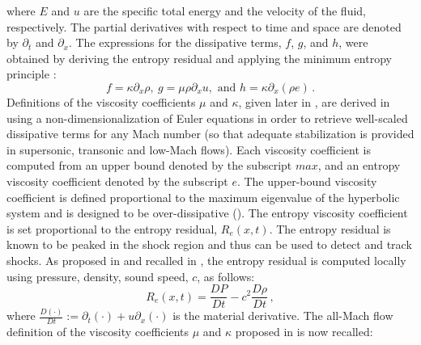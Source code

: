 \documentclass{inputs/mc2015}
\begin{document}
%
where $E$ and $u$ are the specific total energy and the velocity of the fluid, respectively. The partial derivatives with respect to time and space are denoted by $\partial_t$ and $\partial_x$. The expressions for the dissipative terms, $f$, $g$, and $h$, were obtained by deriving the entropy residual and applying the minimum entropy principle \cite{jlg}:
%
\begin{equation}
f = \kappa \partial_x \rho , \ g = \mu \rho \partial_x u, \text{  and  } h = \kappa \partial_x \left( \rho e \right) \, . 
\end{equation}
%
Definitions of the viscosity coefficients $\mu$ and $\kappa$, given later in , are derived in \cite{Marco_paper_low_mach} using a non-dimensionalization of Euler equations in order to retrieve well-scaled dissipative terms for any Mach number (so that adequate stabilization is provided in supersonic, transonic and low-Mach flows). Each viscosity coefficient is computed from an upper bound denoted by the subscript $max$, and an entropy viscosity coefficient denoted by the subscript $e$. The upper-bound viscosity coefficient is defined proportional to the maximum eigenvalue of the hyperbolic system and is designed to be over-dissipative  (). The entropy viscosity coefficient is set proportional to the entropy residual, $R_e(x,t)$.
The entropy residual is known to be peaked in the shock region \cite{Leveque} and thus can be used to detect and track shocks. As proposed in \cite{Marco_paper_low_mach} and recalled in , the entropy residual is computed locally using pressure, density, sound speed, $c$, as follows:
%
\begin{equation}\label{eq:ent-res}
R_e(x,t) = \frac{DP}{Dt} - c^2\frac{D\rho}{Dt} \, ,
\end{equation}
%
where $\frac{D (\cdot)}{Dt} := \partial_t(\cdot) + u  \partial_x(\cdot)$ is the material derivative. 
The all-Mach flow definition of the viscosity coefficients $\mu$ and $\kappa$ proposed in \cite{Marco_paper_low_mach} is now recalled:
\end{document}
